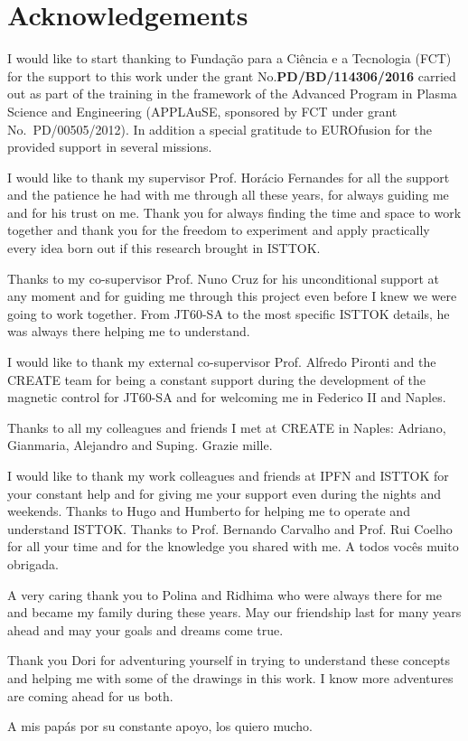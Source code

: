 \chapter*{Acknowledgements}

I would like to start thanking to Funda\c{c}\~{a}o para a Ci\^{e}ncia e a Tecnologia (FCT) for the support to this work under the grant No.\textbf{PD/BD/114306/2016} carried out as part of the training in the framework of the Advanced Program in Plasma Science and Engineering (APPLAuSE, sponsored by FCT under grant No.~PD/00505/2012). In addition a special gratitude to EUROfusion for the provided support in several missions. 
\smallskip

I would like to thank my supervisor Prof. Horácio Fernandes for all the support and the patience he had with me through all these years, for always guiding me and for his trust on me. Thank you for always finding the time and space to work together and thank you for the  freedom to experiment and apply practically every idea born out if this research brought in ISTTOK.
\smallskip

Thanks to my co-supervisor Prof. Nuno Cruz for his unconditional support at any moment and for guiding me through this project even before I knew we were going to work together. From JT60-SA to the most specific ISTTOK details, he was always there helping me to understand.
\smallskip

I would like to thank my external co-supervisor Prof. Alfredo Pironti and the CREATE team for being a constant support during the development of the magnetic control for JT60-SA  and for welcoming me in Federico II and Naples. \smallskip

Thanks to all my colleagues and friends I met at CREATE in Naples: Adriano, Gianmaria, Alejandro and Suping. Grazie mille.\smallskip

I would like to thank my work colleagues and friends at IPFN and ISTTOK for your constant help and for giving me your support even during the nights and weekends. Thanks to Hugo and Humberto for helping me to operate and understand ISTTOK. Thanks to Prof. Bernando Carvalho and Prof. Rui Coelho for all your time and for the knowledge you shared with me. A todos vocês muito obrigada.\smallskip


A very caring thank you to Polina and Ridhima who were always there for me and became my family during these years. May our friendship last for many years ahead and may your goals and dreams come true.\smallskip

Thank you Dori for adventuring yourself in trying to understand these concepts and helping me with some of the drawings in this work. I know more adventures are coming ahead for us both.\smallskip

A mis papás por su constante apoyo, los quiero mucho.   

 





